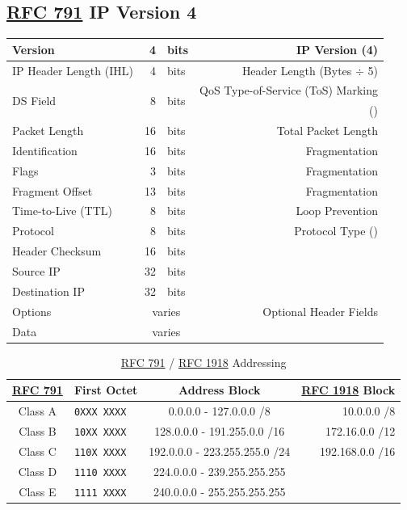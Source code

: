\documentclass[12pt]{article}
\newcommand{\RFC}[1]{\href{https://datatracker.ietf.org/doc/html/rfc#1}{RFC #1}}
\newcommand{\mc}[3]{\multicolumn{#1}{#2}{#3}}
\newcommand{\mr}[2]{\multirow{#1}{*}{#2}}
\begin{document}
	\subsection[RFC 791 IPv4]{\RFC{791} IP Version 4 \label{subsec:IPV4}}
	\begin{table}[H]
	\centering
	\begin{tabular}{| l | r @{ } l | r |}\hline
	Version			& 4		& bits		& IP Version (4)\\\hline
	IP Header Length (IHL)	& 4		& bits		& Header Length (Bytes $\div$ 5)\\\hline
	\mr{2}{DS Field}		& \mr{2}{8}	& \mr{2}{bits}	& QoS Type-of-Service (ToS) Marking\\
					&		&			& (\Cref{sec:QOS})\\\hline
	Packet Length		& 16		& bits		& Total Packet Length\\\hline
	Identification		& 16		& bits		& Fragmentation\\\hline
	Flags				& 3		& bits		& Fragmentation\\\hline
	Fragment Offset		& 13		& bits		& Fragmentation\\\hline
	Time-to-Live (TTL)	& 8		& bits		& Loop Prevention\\\hline
	Protocol			& 8		& bits		& Protocol Type (\Cref{tab:L3 PROTOCOL})\\\hline
	Header Checksum	& 16		& bits		&\\\hline
	Source IP			& 32		& bits		&\\\hline
	Destination IP		& 32		& bits		&\\\hline
	Options			& \mc{2}{c|}{varies}		& Optional Header Fields\\\hline
	Data				& \mc{2}{c|}{varies}		&\\\hline
	\end{tabular}\end{table}

	\begin{table}[H]
	\centering
	\caption{\RFC{791} / \RFC{1918} Addressing \label{tab:ADDRESSING IPV4}}
	\begin{tabular}{@{} c l c r @{}}\hline
	\textbf{\RFC{791}}	& \textbf{First Octet}		& \textbf{Address Block}		& \textbf{\RFC{1918} Block}\\\hline
	Class A 			& \texttt{0XXX XXXX}		& 0.0.0.0 - 127.0.0.0 /8			& 10.0.0.0 /8\\
	Class B 			& \texttt{10XX XXXX}		& 128.0.0.0 - 191.255.0.0 /16		& 172.16.0.0 /12\\
	Class C 			& \texttt{110X XXXX}		& 192.0.0.0 - 223.255.255.0 /24 	& 192.168.0.0 /16\\\hline
	Class D 			& \texttt{1110 XXXX}		& 224.0.0.0 - 239.255.255.255		&\\\hline
	Class E 			& \texttt{1111 XXXX}		& 240.0.0.0 - 255.255.255.255		&\\\hline
	\end{tabular}\end{table}
\end{document}
